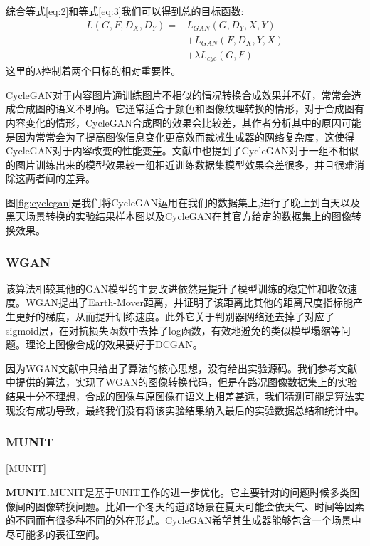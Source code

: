 综合等式\ref{eq:2}和等式\ref{eq:3}我们可以得到总的目标函数:
\begin{equation}
\begin{aligned}
    L(G, F, D_X, D_Y) = & L_{GAN}(G,D_Y, X, Y) \\
    & + L_{GAN}(F,D_X, Y, X) \\
    & + \lambda L_{cyc}(G, F)
\end{aligned}
\end{equation}
这里的$\lambda$控制着两个目标的相对重要性。

CycleGAN对于内容图片通训练图片不相似的情况转换合成效果并不好，常常会造成合成图的语义不明确。它通常适合于颜色和图像纹理转换的情形，对于合成图有内容变化的情形，CycleGAN合成图的效果会比较差，其作者分析其中的原因可能是因为常常会为了提高图像信息变化更高效而裁减生成器的网络复杂度，这使得CycleGAN对于内容改变的性能变差。文献\cite{CycleGAN}中也提到了CycleGAN对于一组不相似的图片训练出来的模型效果较一组相近训练数据集模型效果会差很多，并且很难消除这两者间的差异。

图\ref{fig:cyclegan}是我们将CycleGAN运用在我们的数据集上,进行了晚上到白天以及黑天场景转换的实验结果样本图以及CycleGAN在其官方给定的数据集上的图像转换效果。 


\subsubsection{WGAN}

 该算法相较其他的GAN模型的主要改进依然是提升了模型训练的稳定性和收敛速度。WGAN提出了Earth-Mover距离，并证明了该距离比其他的距离尺度指标能产生更好的梯度，从而提升训练速度。此外它关于判别器网络还去掉了对应了sigmoid层，在对抗损失函数中去掉了log函数，有效地避免的类似模型塌缩等问题。理论上图像合成的效果要好于DCGAN。

因为WGAN文献中只给出了算法的核心思想，没有给出实验源码。我们参考文献中提供的算法，实现了WGAN的图像转换代码，但是在路况图像数据集上的实验结果十分不理想，合成的图像与原图像在语义上相差甚远，我们猜测可能是算法实现没有成功导致，最终我们没有将该实验结果纳入最后的实验数据总结和统计中。

\subsubsection{MUNIT}[MUNIT]

\textbf{MUNIT.}\cite{MUNIT}\quad MUNIT是基于UNIT\cite{UNIT}工作的进一步优化。它主要针对的问题时候多类图像间的图像转换问题。比如一个冬天的道路场景在夏天可能会依天气、时间等因素的不同而有很多种不同的外在形式。CycleGAN希望其生成器能够包含一个场景中尽可能多的表征空间。

